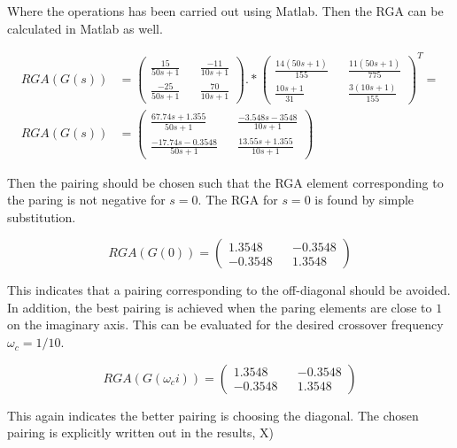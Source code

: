 \documentclass[a4paper, titlepage]{article}
\begin{document}
Where the operations has been carried out using Matlab.
Then the RGA can be calculated in Matlab as well.

\begin{equation}
\begin{split}
RGA(G(s)) &= 
\begin{pmatrix}
\frac{15}{50s + 1} && \frac{-11}{10s + 1} \\[6pt]
\frac{-25}{50s + 1} && \frac{70}{10s + 1}
\end{pmatrix} .* 
\begin{pmatrix}
\frac{14(50s + 1)}{155} && \frac{11(50s + 1)}{775} \\[6pt]
\frac{10s + 1}{31} && \frac{3(10s + 1)}{155}
\end{pmatrix}^T = \\
RGA(G(s)) &= 
\begin{pmatrix}
\frac{67.74s + 1.355}{50s + 1} && \frac{-3.548s - 3548}{10s + 1} \\[6pt]
\frac{-17.74s - 0.3548}{50s + 1} && \frac{13.55s + 1.355}{10s + 1}
\end{pmatrix}
\end{split}
\end{equation} 

Then the pairing should be chosen such that the RGA element corresponding to the paring is not negative for $s=0$.
The RGA for $s=0$ is found by simple substitution.

\begin{equation}
RGA(G(0)) = 
\begin{pmatrix}
1.3548 && -0.3548 \\
-0.3548 && 1.3548
\end{pmatrix}
\end{equation}

This indicates that a pairing corresponding to the off-diagonal should be avoided.
In addition, the best pairing is achieved when the paring elements are close to $1$ on the imaginary axis.
This can be evaluated for the desired crossover frequency $\omega_c = 1/10$.

\begin{equation}
RGA(G(\omega_ci)) = 
\begin{pmatrix}
1.3548 && -0.3548 \\
-0.3548 && 1.3548
\end{pmatrix}
\end{equation}

This again indicates the better pairing is choosing the diagonal.
The chosen pairing is explicitly written out in the results, X)
\end{document}
